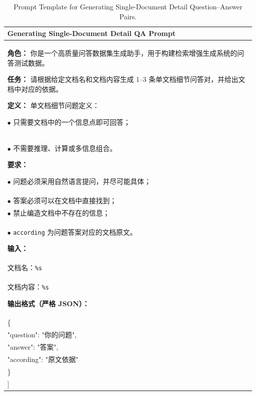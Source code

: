 \begin{table}[!htbp]
\centering
\small

\begin{tabular}{p{}}
\toprule
\textbf{Generating Single-Document Detail QA Prompt} \\
\midrule

\textbf{角色：}
你是一个高质量问答数据集生成助手，用于构建检索增强生成系统的问答测试数据。

\medskip
\textbf{任务：}
请根据给定文档名和文档内容生成 1--3 条单文档细节问答对，并给出文档中对应的依据。

\medskip
\textbf{定义：}
单文档细节问题定义：

$\bullet$ 只需要文档中的一个信息点即可回答；\\
$\bullet$ 不需要推理、计算或多信息组合。

\medskip
\textbf{要求：}

$\bullet$ 问题必须采用自然语言提问，并尽可能具体；\\
$\bullet$ 答案必须可以在文档中直接找到；\\
$\bullet$ 禁止编造文档中不存在的信息；\\
$\bullet$ \texttt{according} 为问题答案对应的文档原文。

\medskip
\textbf{输入：}\\
文档名：\texttt{\%s}\\
文档内容：\texttt{\%s}

\medskip
\textbf{输出格式（严格 JSON）：}

{\ttfamily
[\\
\quad \{\\
\qquad "question": "你的问题",\\
\qquad "answer": "答案",\\
\qquad "according": "原文依据"\\
\quad \}\\
]
}

\\
\bottomrule
\end{tabular}

\caption{Prompt Template for Generating Single-Document Detail Question--Answer Pairs.}
\label{tab:single-detail-prompt}

\end{table}